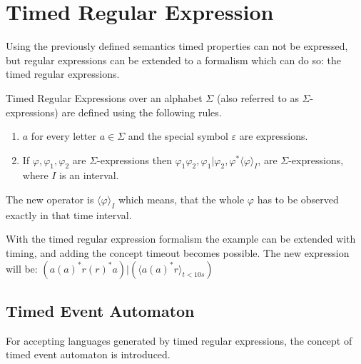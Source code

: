 		
	\section{Timed Regular Expression}
	
		Using the previously defined semantics timed properties can not be expressed,
		but regular expressions can be extended to a formalism which can do so: 
		the timed regular expressions.
		

		\begin{dfn}
			\label{dfn:cep:tre}
			Timed Regular Expressions over an alphabet $\Sigma$ (also referred to as $\Sigma$-expressions)
			are defined using the following rules.
			\begin{enumerate}
				\item \underline{$a$} for every letter $a \in \Sigma$ and the special symbol $\varepsilon$ are expressions.
				\item If $\varphi, \varphi_1, \varphi_2$ are $\Sigma$-expressions then %
					$ %
					\varphi_1 \varphi_2,
					\varphi_1 | \varphi_2,
					\varphi^\ast
					\langle \varphi \rangle_I$, 
					are $\Sigma$-expressions, where $I$ is an interval\citep{tre}.
			\end{enumerate}
		\end{dfn}

		The new operator is $\langle \varphi \rangle_I$ which means, that the whole $\varphi$ has to be observed exactly in that time interval.

		With the timed regular expression formalism the example can be extended with timing, and adding the concept timeout becomes possible.
		The new expression will be: $(a (a)^\ast r(r)^\ast a)|( \langle a(a)^\ast r \rangle_{t < 10 s})$
		
		
		\subsection{Timed Event Automaton}
			For accepting languages generated by timed regular expressions, the concept of timed event automaton is introduced.
			
